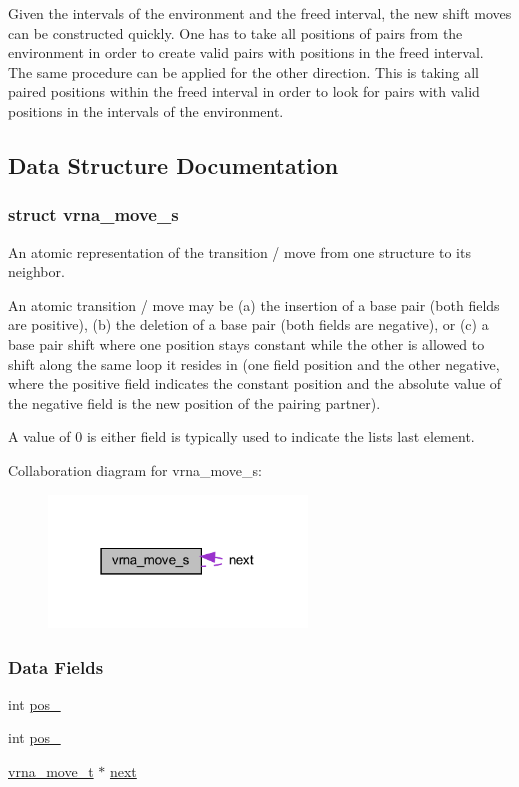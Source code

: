 Given the intervals of the environment and the freed interval, the new shift moves can be constructed quickly. One has to take all positions of pairs from the environment in order to create valid pairs with positions in the freed interval. The same procedure can be applied for the other direction. This is taking all paired positions within the freed interval in order to look for pairs with valid positions in the intervals of the environment. 

\subsection{Data Structure Documentation}
\label{structvrna__move__s}
\subsubsection{struct vrna\+\_\+move\+\_\+s}
An atomic representation of the transition / move from one structure to its neighbor. 

An atomic transition / move may be (a) the insertion of a base pair (both fields are positive), (b) the deletion of a base pair (both fields are negative), or (c) a base pair shift where one position stays constant while the other is allowed to shift along the same loop it resides in (one field position and the other negative, where the positive field indicates the constant position and the absolute value of the negative field is the new position of the pairing partner).

A value of 0 is either field is typically used to indicate the lists last element. 

Collaboration diagram for vrna\+\_\+move\+\_\+s\+:
\nopagebreak
\begin{figure}[H]
\begin{center}
\leavevmode
\includegraphics[width=195pt]{structvrna__move__s__coll__graph}
\end{center}
\end{figure}
\subsubsection*{Data Fields}
\begin{DoxyCompactItemize}
\item 
int \hyperlink{group__neighbors_a8af908c74786675a456d0f20cc8fcb9b}{pos\+\_}
\item 
int \hyperlink{group__neighbors_a3849db905a45c4e399991df38705a36b}{pos\+\_}
\item 
\hyperlink{group__neighbors_structvrna__move__s}{vrna\+\_\+move\+\_\+t} $\ast$ \hyperlink{group__neighbors_a181681bc3aab907d93e340df4777e759}{next}
\end{DoxyCompactItemize}


